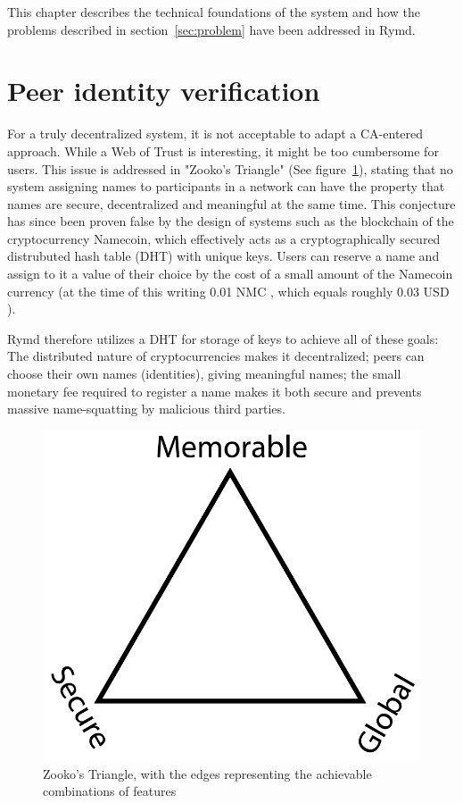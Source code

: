 This chapter describes the technical foundations of the system and how the problems described in section~\ref{sec:problem} have been addressed in Rymd.


\section{Peer identity verification}
\label{sec:authorization}
For a truly decentralized system, it is not acceptable to adapt a CA-entered approach. While a Web of Trust is interesting, it might be too cumbersome for users. This issue is addressed in "Zooko's Triangle" (See figure~\ref{fig:zooko}), stating that no system assigning names to participants in a network can have the property that names are secure, decentralized and meaningful at the same time. This conjecture has since been proven false by the design of systems such as the blockchain of the cryptocurrency Namecoin, which effectively acts as a cryptographically secured distrubuted hash table (DHT) with unique keys. Users can reserve a name and assign to it a value of their choice by the cost of a small amount of the Namecoin currency (at the time of this writing 0.01 NMC \cite{Namecoin:2014:Online}, which equals roughly 0.03 USD \cite{CryptoCoinCharts:2014:Online}).

Rymd therefore utilizes a DHT for storage of keys to achieve all of these goals: The distributed nature of cryptocurrencies makes it decentralized; peers can choose their own names (identities), giving meaningful names; the small monetary fee required to register a name makes it both secure and prevents massive name-squatting by malicious third parties.

\begin{figure}[h]
\centering
\includegraphics[width=\textwidth,height=0.2\paperheight,keepaspectratio
]{figures/Zooko_s_Triangle}
\caption{Zooko's Triangle, with the edges representing the achievable combinations of features \cite{Zooko:2001:Online}}
\label{fig:zooko}
\end{figure}

